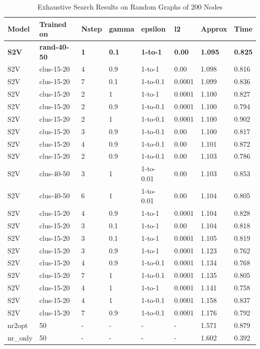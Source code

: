 \documentclass[10pt,a4paper,draft]{article}
\begin{document}
\begin{table}[]
\centering
\begin{tabular}{@{}llllllll@{}}
\toprule
\textbf{Model} & \textbf{Trained on} & \textbf{Nstep} & \textbf{gamma} & \textbf{epsilon} & \textbf{l2} & \textbf{Approx} & \textbf{Time} \\ \midrule
\textbf{S2V} & \textbf{rand-40-50} & \textbf{1} & \textbf{0.1} & \textbf{1-to-1} & \textbf{0.00} & \textbf{1.095} & \textbf{0.825} \\
S2V & clus-15-20 & 4 & 0.9 & 1-to-1 & 0.00 & 1.098 & 0.816 \\
S2V & clus-15-20 & 7 & 0.1 & 1-to-0.1 & 0.0001 & 1.099 & 0.836 \\
S2V & clus-15-20 & 2 & 1 & 1-to-1 & 0.0001 & 1.100 & 0.827 \\
S2V & clus-15-20 & 2 & 0.9 & 1-to-0.1 & 0.0001 & 1.100 & 0.794 \\
S2V & clus-15-20 & 2 & 1 & 1-to-0.1 & 0.0001 & 1.100 & 0.902 \\
S2V & clus-15-20 & 3 & 0.9 & 1-to-0.1 & 0.00 & 1.100 & 0.817 \\
S2V & clus-15-20 & 4 & 0.9 & 1-to-0.1 & 0.00 & 1.101 & 0.872 \\
S2V & clus-15-20 & 2 & 0.9 & 1-to-0.1 & 0.00 & 1.103 & 0.786 \\
S2V & clus-40-50 & 3 & 1 & 1-to-0.01 & 0.00 & 1.103 & 0.853 \\
S2V & clus-40-50 & 6 & 1 & 1-to-0.01 & 0.00 & 1.104 & 0.805 \\
S2V & clus-15-20 & 4 & 0.9 & 1-to-1 & 0.0001 & 1.104 & 0.828 \\
S2V & clus-15-20 & 3 & 0.1 & 1-to-1 & 0.00 & 1.104 & 0.818 \\
S2V & clus-15-20 & 3 & 0.1 & 1-to-1 & 0.0001 & 1.105 & 0.819 \\
S2V & clus-15-20 & 3 & 0.9 & 1-to-1 & 0.0001 & 1.123 & 0.762 \\
S2V & clus-15-20 & 4 & 0.9 & 1-to-0.1 & 0.0001 & 1.134 & 0.768 \\
S2V & clus-15-20 & 7 & 1 & 1-to-0.1 & 0.0001 & 1.135 & 0.805 \\
S2V & clus-15-20 & 4 & 1 & 1-to-1 & 0.0001 & 1.141 & 0.758 \\
S2V & clus-15-20 & 4 & 1 & 1-to-0.1 & 0.0001 & 1.158 & 0.837 \\
S2V & clus-15-20 & 7 & 0.9 & 1-to-0.1 & 0.0001 & 1.176 & 0.792 \\
nr2opt & 50 & - & - & - & - & 1.571 & 0.879 \\
nr\_only & 50 & - & - & - & - & 1.602 & 0.392 \\ \bottomrule
\end{tabular}
\caption{Exhaustive Search Results on Random Graphs of 200 Nodes}
\label{exhastive-search-results200}
\end{table}
\end{document}
